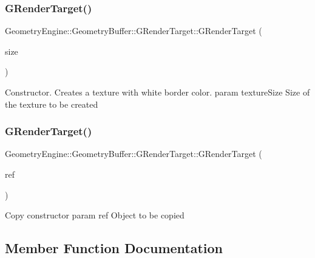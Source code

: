 \subsubsection{\texorpdfstring{GRenderTarget()}{GRenderTarget()}\hspace{0.1cm}{\footnotesize\ttfamily [1/2]}}
{\footnotesize\ttfamily Geometry\+Engine\+::\+Geometry\+Buffer\+::\+G\+Render\+Target\+::\+G\+Render\+Target (\begin{DoxyParamCaption}\item[{const Q\+Vector2D \&}]{size }\end{DoxyParamCaption})}

Constructor. Creates a texture with white border color. param texture\+Size Size of the texture to be created \mbox{\label{class_geometry_engine_1_1_geometry_buffer_1_1_g_render_target_a26d555dc583ad6ae0c545f26db97274d}} 
\subsubsection{\texorpdfstring{GRenderTarget()}{GRenderTarget()}\hspace{0.1cm}{\footnotesize\ttfamily [2/2]}}
{\footnotesize\ttfamily Geometry\+Engine\+::\+Geometry\+Buffer\+::\+G\+Render\+Target\+::\+G\+Render\+Target (\begin{DoxyParamCaption}\item[{const \mbox{\hyperlink{class_geometry_engine_1_1_geometry_buffer_1_1_g_render_target}{G\+Render\+Target}} \&}]{ref }\end{DoxyParamCaption})}

Copy constructor param ref Object to be copied 

\subsection{Member Function Documentation}
\mbox{\label{class_geometry_engine_1_1_geometry_buffer_1_1_g_render_target_a3b14d8929cf9d2acb6bc263c709ff019}} 
